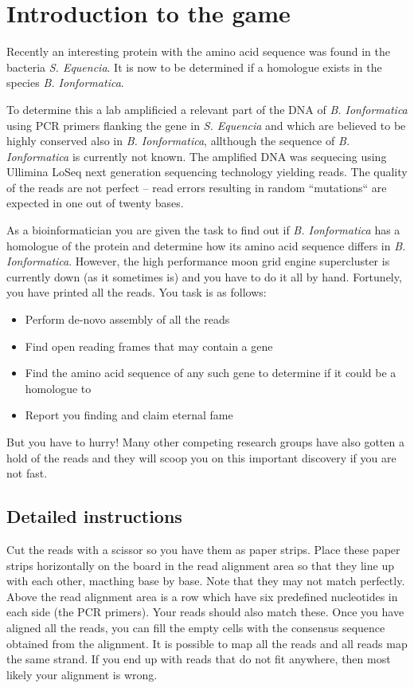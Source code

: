\section*{Introduction to the game}

Recently an interesting protein with the amino acid sequence \mutantprotein{ }was found in the bacteria \emph{S. Equencia}. 
It is now to be determined if a homologue exists in the species \emph{B. Ionformatica}.

To determine this a lab amplificied a relevant part of the DNA of \emph{B. Ionformatica} using PCR primers flanking
the gene in \emph{S. Equencia} and which are believed to be highly conserved also in \emph{B. Ionformatica}, allthough
the sequence of \emph{B. Ionformatica} is currently not known.
The amplified DNA was sequecing using Ullimina LoSeq next generation sequencing technology yielding \numberofreads{ } reads.
The quality of the reads are not perfect -- read errors resulting in random ``mutations`` are expected in one out of twenty bases. 

As a bioinformatician you are given the task to find out if \emph{B. Ionformatica} has a homologue of the protein \mutantprotein{ } and 
determine how its amino acid sequence differs in \emph{B. Ionformatica}.
However, the high performance moon grid engine supercluster is currently down (as it sometimes is) and you have to do it all by hand. 
Fortunely, you have printed all the reads. 
You task is as follows:

\begin{itemize} 
\item Perform de-novo assembly of all the reads
\item Find open reading frames that may contain a gene
\item Find the amino acid sequence of any such gene to determine if it could be a homologue to \mutantprotein{ }
\item Report you finding and claim eternal fame 
\end{itemize}

But you have to hurry! Many other competing research groups have also gotten a hold of the reads and 
they will scoop you on this important discovery if you are not fast. 

\subsection*{Detailed instructions}

Cut the reads with a scissor so you have them as paper strips. Place these paper strips horizontally on the board in the read alignment area
 so that they line up with each other, macthing base by base. Note that they may not match perfectly. Above the read alignment area
is a row which have six predefined nucleotides in each side (the PCR primers). Your reads should also match these.  
Once you have aligned all the reads, you can fill the empty cells with the consensus sequence obtained from the alignment. 
It is possible to map all the reads and all reads map the same strand. 
If you end up with reads that do not fit anywhere, then most likely your alignment is wrong. 

